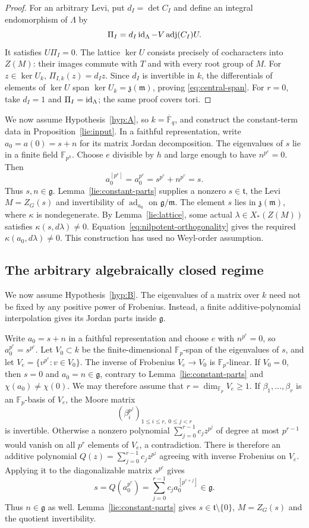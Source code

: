 \begin{proof}
For an arbitrary Levi, put $d_I=\det C_I$ and define an integral
endomorphism of $\Lambda$ by
\[
 \Pi_I=d_I\operatorname{id}_\Lambda-V\operatorname{adj}(C_I)U.
\]
It satisfies $U\Pi_I=0$.  The lattice $\ker U$ consists precisely of
cocharacters into $Z(M)$: their images commute with $T$ and with
every root group of $M$.  For $z\in\ker U_k$,
$\Pi_{I,k}(z)=d_Iz$.  Since $d_I$ is invertible in $k$, the
differentials of elements of $\ker U$ span
$\ker U_k=\mathfrak z(\mathfrak m)$, proving
\eqref{eq:central-span}.  For $r=0$, take $d_I=1$ and
$\Pi_I=\operatorname{id}_\Lambda$; the same proof covers tori.
\end{proof}

We now assume Hypothesis~\ref{hyp:A}, so
$k=\overline{\mathbb F}_q$, and construct the constant-term data in
Proposition~\ref{lie:input}.  In a faithful representation, write
$a_0=a(0)=s+n$ for its matrix Jordan decomposition.  The eigenvalues
of $s$ lie in a finite field $\mathbb F_{p^h}$.  Choose $e$ divisible
by $h$ and large enough to have $n^{p^e}=0$.  Then
\[
 a_0^{[p^e]}=a_0^{p^e}=s^{p^e}+n^{p^e}=s.
\]
Thus $s,n\in\mathfrak g$.  Lemma~\ref{lie:constant-parts} supplies
a nonzero $s\in\mathfrak t$, the Levi $M=Z_G(s)$ and invertibility
of $\operatorname{ad}_{a_0}$ on $\mathfrak g/\mathfrak m$.
The element $s$ lies in $\mathfrak z(\mathfrak m)$, where $\kappa$
is nondegenerate.  By Lemma~\ref{lie:lattice}, some actual
$\lambda\in X_*(Z(M))$ satisfies $\kappa(s,d\lambda)\ne0$.
Equation~\eqref{eq:nilpotent-orthogonality} gives the required
$\kappa(a_0,d\lambda)\ne0$.  This construction has used no
Weyl-order assumption.

\subsection{The arbitrary algebraically closed regime}

We now assume Hypothesis~\ref{hyp:B}.  The eigenvalues of a matrix
over $k$ need not be fixed by any positive power of Frobenius.
Instead, a finite additive-polynomial interpolation gives its
Jordan parts inside $\mathfrak g$.

Write $a_0=s+n$ in a faithful representation and choose $e$ with
$n^{p^e}=0$, so $a_0^{p^e}=s^{p^e}$.  Let $V_0\subset k$ be the
finite-dimensional $\mathbb F_p$-span of the eigenvalues of $s$,
and let $V_e=\{v^{p^e}:v\in V_0\}$.  The inverse of Frobenius
$V_e\to V_0$ is $\mathbb F_p$-linear.  If $V_0=0$, then $s=0$ and
$a_0=n\in\mathfrak g$, contrary to
Lemma~\ref{lie:constant-parts} and $\chi(a_0)\ne\chi(0)$.
We may therefore assume that $r=\dim_{\mathbb F_p}V_e\ge1$.
If
$\beta_1,\ldots,\beta_r$ is an $\mathbb F_p$-basis of $V_e$, the
Moore matrix
\[
 (\beta_i^{p^j})_{1\le i\le r,\ 0\le j<r}
\]
is invertible.  Otherwise a nonzero polynomial
$\sum_{j=0}^{r-1}c_j z^{p^j}$ of degree at most $p^{r-1}$ would
vanish on all $p^r$ elements of $V_e$, a contradiction.
There is therefore an additive polynomial
$Q(z)=\sum_{j=0}^{r-1}c_jz^{p^j}$ agreeing with inverse Frobenius
on $V_e$.  Applying it to the diagonalizable matrix $s^{p^e}$ gives
\[
 s=Q(a_0^{p^e})=\sum_{j=0}^{r-1}c_j a_0^{[p^{e+j}]}\in\mathfrak g.
\]
Thus $n\in\mathfrak g$ as well.  Lemma~\ref{lie:constant-parts} gives
$s\in\mathfrak t\setminus\{0\}$, $M=Z_G(s)$ and the quotient
invertibility.

